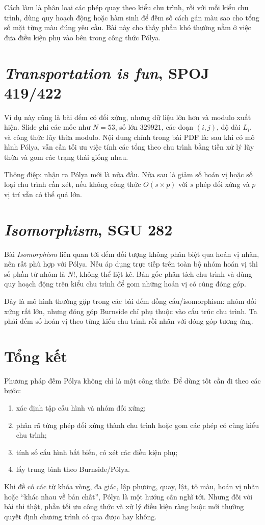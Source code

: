 \documentclass[11pt]{article}
\begin{document}
Cách làm là phân loại các phép quay theo kiểu chu trình, rồi với mỗi kiểu
chu trình, dùng quy hoạch động hoặc hàm sinh để đếm số cách gán màu sao cho
tổng số mặt từng màu đúng yêu cầu. Bài này cho thấy phần khó thường nằm ở việc
đưa điều kiện phụ vào bên trong công thức Pólya.

\section{\textit{Transportation is fun}, SPOJ 419/422}

Ví dụ này cũng là bài đếm có đối xứng, nhưng dữ liệu lớn hơn và modulo xuất
hiện. Slide ghi các mốc như \(N=53\), số lớn \(329921\), các đoạn
\((i,j)\), độ dài \(L_i\), và công thức lũy thừa modulo. Nội dung chính trong
bài PDF là: sau khi có mô hình Pólya, vẫn cần tối ưu việc tính các tổng theo
chu trình bằng tiền xử lý lũy thừa và gom các trạng thái giống nhau.

Thông điệp: nhận ra Pólya mới là nửa đầu. Nửa sau là giảm số hoán vị hoặc số
loại chu trình cần xét, nếu không công thức \(O(s\times p)\) với \(s\) phép
đối xứng và \(p\) vị trí vẫn có thể quá lớn.

\section{\textit{Isomorphism}, SGU 282}

Bài \textit{Isomorphism} liên quan tới đếm đối tượng không phân biệt qua hoán
vị nhãn, nên rất phù hợp với Pólya. Nếu áp dụng trực tiếp trên toàn bộ nhóm
hoán vị thì số phần tử nhóm là \(N!\), không thể liệt kê. Bản gốc phân tích
chu trình và dùng quy hoạch động trên kiểu chu trình để gom những hoán vị có
cùng đóng góp.

Đây là mô hình thường gặp trong các bài đếm đồng cấu/isomorphism: nhóm đối
xứng rất lớn, nhưng đóng góp Burnside chỉ phụ thuộc vào cấu trúc chu trình.
Ta phải đếm số hoán vị theo từng kiểu chu trình rồi nhân với đóng góp tương
ứng.

\section{Tổng kết}

Phương pháp đếm Pólya không chỉ là một công thức. Để dùng tốt cần đi theo các
bước:
\begin{enumerate}
  \item xác định tập cấu hình và nhóm đối xứng;
  \item phân rã từng phép đối xứng thành chu trình hoặc gom các phép có cùng
  kiểu chu trình;
  \item tính số cấu hình bất biến, có xét các điều kiện phụ;
  \item lấy trung bình theo Burnside/Pólya.
\end{enumerate}

Khi đề có các từ khóa vòng, đa giác, lập phương, quay, lật, tô màu, hoán vị
nhãn hoặc ``khác nhau về bản chất'', Pólya là một hướng cần nghĩ tới. Nhưng
đối với bài thi thật, phần tối ưu công thức và xử lý điều kiện ràng buộc mới
thường quyết định chương trình có qua được hay không.
\end{document}
